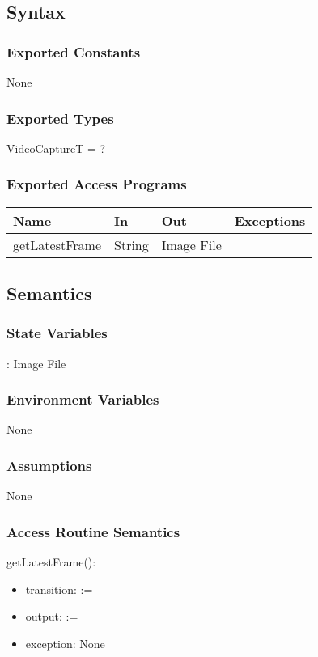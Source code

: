\documentclass[12pt, titlepage]{article}
\begin{document}
\subsection{Syntax}

\subsubsection{Exported Constants}
None

\subsubsection{Exported Types}
VideoCaptureT = ?

\subsubsection{Exported Access Programs}

\begin{tabular}{l l l l}
\hline
\textbf{Name} & \textbf{In} & \textbf{Out} & \textbf{Exceptions} \\
\hline
getLatestFrame & String & Image File & \\
\hline
\end{tabular}

\subsection{Semantics}

\subsubsection{State Variables}
: Image File \\

\subsubsection{Environment Variables}
None

\subsubsection{Assumptions}
None

\subsubsection{Access Routine Semantics}

\noindent getLatestFrame():
\begin{itemize}
\item transition:  := 
\item output:  :=  
\item exception: None
\end{itemize}
\end{document}
